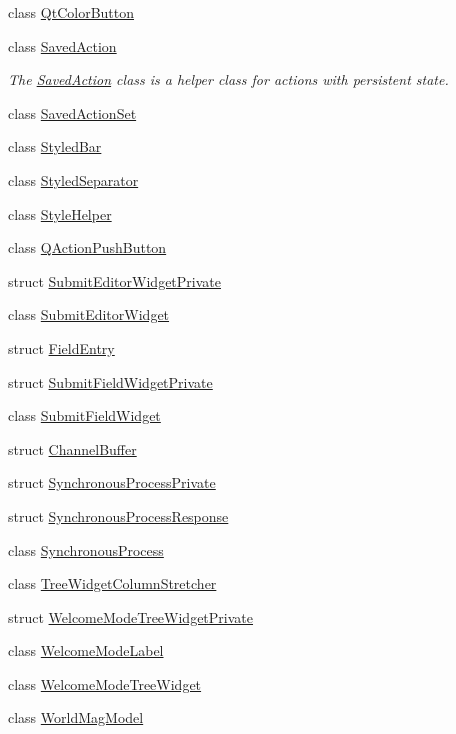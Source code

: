 \begin{DoxyCompactItemize}
\item 
class \hyperlink{class_utils_1_1_qt_color_button}{\-Qt\-Color\-Button}
\item 
class \hyperlink{class_utils_1_1_saved_action}{\-Saved\-Action}
\begin{DoxyCompactList}\small\item\em \-The \hyperlink{class_utils_1_1_saved_action}{\-Saved\-Action} class is a helper class for actions with persistent state. \end{DoxyCompactList}\item 
class \hyperlink{class_utils_1_1_saved_action_set}{\-Saved\-Action\-Set}
\item 
class \hyperlink{class_utils_1_1_styled_bar}{\-Styled\-Bar}
\item 
class \hyperlink{class_utils_1_1_styled_separator}{\-Styled\-Separator}
\item 
class \hyperlink{class_utils_1_1_style_helper}{\-Style\-Helper}
\item 
class \hyperlink{class_utils_1_1_q_action_push_button}{\-Q\-Action\-Push\-Button}
\item 
struct \hyperlink{struct_utils_1_1_submit_editor_widget_private}{\-Submit\-Editor\-Widget\-Private}
\item 
class \hyperlink{class_utils_1_1_submit_editor_widget}{\-Submit\-Editor\-Widget}
\item 
struct \hyperlink{struct_utils_1_1_field_entry}{\-Field\-Entry}
\item 
struct \hyperlink{struct_utils_1_1_submit_field_widget_private}{\-Submit\-Field\-Widget\-Private}
\item 
class \hyperlink{class_utils_1_1_submit_field_widget}{\-Submit\-Field\-Widget}
\item 
struct \hyperlink{struct_utils_1_1_channel_buffer}{\-Channel\-Buffer}
\item 
struct \hyperlink{struct_utils_1_1_synchronous_process_private}{\-Synchronous\-Process\-Private}
\item 
struct \hyperlink{struct_utils_1_1_synchronous_process_response}{\-Synchronous\-Process\-Response}
\item 
class \hyperlink{class_utils_1_1_synchronous_process}{\-Synchronous\-Process}
\item 
class \hyperlink{class_utils_1_1_tree_widget_column_stretcher}{\-Tree\-Widget\-Column\-Stretcher}
\item 
struct \hyperlink{struct_utils_1_1_welcome_mode_tree_widget_private}{\-Welcome\-Mode\-Tree\-Widget\-Private}
\item 
class \hyperlink{class_utils_1_1_welcome_mode_label}{\-Welcome\-Mode\-Label}
\item 
class \hyperlink{class_utils_1_1_welcome_mode_tree_widget}{\-Welcome\-Mode\-Tree\-Widget}
\item 
class \hyperlink{class_utils_1_1_world_mag_model}{\-World\-Mag\-Model}
\end{DoxyCompactItemize}
